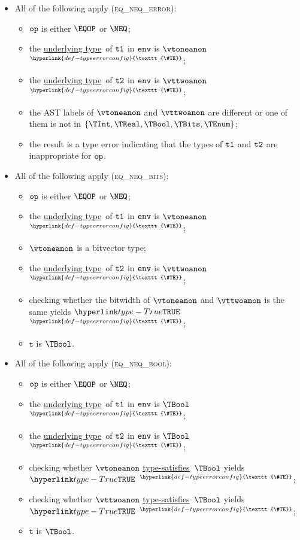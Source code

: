 \documentclass{book}
\newcommand\TypeErrorConfig[0]{\hyperlink{def-typeerrorconfig}{\texttt{\#TE}}}
\newcommand\ProseOrTypeError[0]{\hyperlink{def-proseortypeerror}{$^{\TypeErrorConfig}$}}
\newcommand\underlyingtype[0]{\hyperlink{def-underlyingtype}{underlying type}}
\newcommand\typesatisfies[0]{\hyperlink{def-typesatisfies}{type-satisfies}}
\newcommand\vt[0]{\texttt{t}}
\begin{document}
\begin{itemize}
  \item All of the following apply (\textsc{eq\_neq\_error}):
  \begin{itemize}
    \item $\texttt{op}$ is either $\EQOP$ or $\NEQ$;
    \item the \underlyingtype\ of $\texttt{t1}$ in $\texttt{env}$ is $\vtoneanon$ \ProseOrTypeError;
    \item the \underlyingtype\ of $\texttt{t2}$ in $\texttt{env}$ is $\vttwoanon$ \ProseOrTypeError;
    \item the AST labels of $\vtoneanon$ and $\vttwoanon$ are different or one of them is not in
          $\{\TInt, \TReal, \TBool, \TBits, \TEnum\}$;
    \item the result is a type error indicating that the types of $\texttt{t1}$ and $\texttt{t2}$ are inappropriate for $\texttt{op}$.
  \end{itemize}

  \item All of the following apply (\textsc{eq\_neq\_bits}):
  \begin{itemize}
    \item $\texttt{op}$ is either $\EQOP$ or $\NEQ$;
    \item the \underlyingtype\ of $\texttt{t1}$ in $\texttt{env}$ is $\vtoneanon$ \ProseOrTypeError;
    \item $\vtoneanon$ is a bitvector type;
    \item the \underlyingtype\ of $\texttt{t2}$ in $\texttt{env}$ is $\vttwoanon$ \ProseOrTypeError;
    \item checking whether the bitwidth of $\vtoneanon$ and $\vttwoanon$ is the same yields $\True$ \ProseOrTypeError;
    \item $\vt$ is $\TBool$.
  \end{itemize}

  \item All of the following apply (\textsc{eq\_neq\_bool}):
  \begin{itemize}
    \item $\texttt{op}$ is either $\EQOP$ or $\NEQ$;
    \item the \underlyingtype\ of $\texttt{t1}$ in $\texttt{env}$ is $\TBool$ \ProseOrTypeError;
    \item the \underlyingtype\ of $\texttt{t2}$ in $\texttt{env}$ is $\TBool$ \ProseOrTypeError;
    \item checking whether $\vtoneanon$ \typesatisfies\ $\TBool$ yields $\True$ \ProseOrTypeError;
    \item checking whether $\vttwoanon$ \typesatisfies\ $\TBool$ yields $\True$ \ProseOrTypeError;
    \item $\vt$ is $\TBool$.
  \end{itemize}


\end{itemize}
\end{document}
